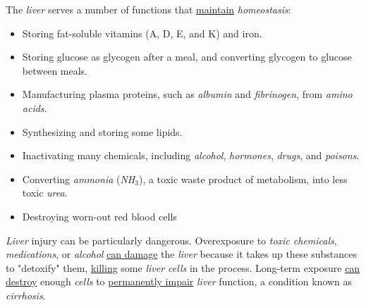 \documentclass[11pt]{article}
\begin{document}
The \emph{liver} serves a number of functions that \uline{maintain} \emph{homeostasis}:
\begin{itemize}
\item Storing fat-soluble vitamins (A, D, E, and K) and iron.
\item Storing glucose as glycogen after a meal, and converting glycogen to glucose
between meals.
\item Manufacturing plasma proteins, such as \emph{albumin} and \emph{fibrinogen}, from \emph{amino
acids}.
\item Synthesizing and storing some lipids.
\item Inactivating many chemicals, including \emph{alcohol}, \emph{hormones}, \emph{drugs}, and \emph{poisons}.
\item Converting \emph{ammonia} (\emph{NH\(_{\text{3}}\)}), a toxic waste product of metabolism, into less
toxic \emph{urea}.
\item Destroying worn-out red blood cells
\end{itemize}

\emph{Liver} injury can be particularly dangerous. Overexposure to \emph{toxic chemicals},
\emph{medications}, or \emph{alcohol} \uline{can damage} the \emph{liver} because it takes up these
substances to "detoxify" them, \uline{killing} some \emph{liver cells} in the process.
Long-term exposure \uline{can destroy} enough \emph{cells} to \uline{permanently impair} \emph{liver}
function, a condition known as \emph{cirrhosis}.
\end{document}
